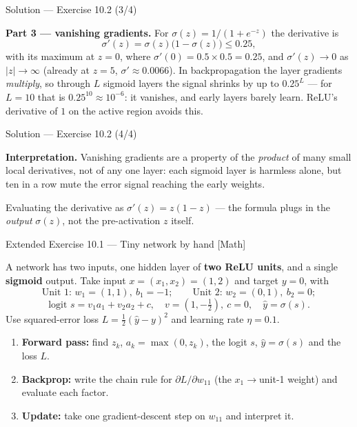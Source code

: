 \documentclass[aspectratio=169,11pt]{beamer}
\begin{document}
\begin{frame}{Solution --- Exercise 10.2 (3/4)}
\begin{solutionbox}
  \textbf{Part 3 --- vanishing gradients.} For
  $\sigma(z) = 1/(1 + e^{-z})$ the derivative is
  \[
    \sigma'(z) = \sigma(z)\big(1 - \sigma(z)\big) \le 0.25 ,
  \]
  with its maximum at $z = 0$, where $\sigma'(0) = 0.5 \times 0.5 = 0.25$,
  and $\sigma'(z) \to 0$ as $|z| \to \infty$ (already at $z = 5$,
  $\sigma' \approx 0.0066$). In backpropagation the
  layer gradients \emph{multiply}, so through $L$ sigmoid layers the
  signal shrinks by up to $0.25^{L}$ --- for $L = 10$ that is
  $0.25^{10} \approx 10^{-6}$: it vanishes, and early
  layers barely learn. ReLU's derivative of $1$ on the active region
  avoids this.
\end{solutionbox}
\end{frame}

\begin{frame}{Solution --- Exercise 10.2 (4/4)}
\begin{solutionbox}
  \medskip
  \textbf{Interpretation.} Vanishing gradients are a property of the
  \emph{product} of many small local derivatives, not of any one layer:
  each sigmoid layer is harmless alone, but ten in a row mute the error
  signal reaching the early weights.

\end{solutionbox}
\begin{mistake}
  Evaluating the derivative as $\sigma'(z) = z(1 - z)$ --- the formula plugs in
  the \emph{output} $\sigma(z)$, not the pre-activation $z$ itself.
\end{mistake}
\end{frame}

\begin{frame}{Extended Exercise 10.1 --- Tiny network by hand [Math]}
\begin{longexercise}
  A network has two inputs, one hidden layer of \textbf{two ReLU units}, and a single
  \textbf{sigmoid} output. Take input $x=(x_1,x_2)=(1,2)$ and target $y=0$, with
  \[
    \text{Unit 1: } w_1=(1,1),\ b_1=-1;\qquad
    \text{Unit 2: } w_2=(0,1),\ b_2=0;
  \]
  \[
    \text{logit } s=v_1a_1+v_2a_2+c,\quad v=(1,-\tfrac12),\ c=0,\quad
    \hat y=\sigma(s).
  \]
  Use squared-error loss $L=\tfrac12(\hat y-y)^2$ and learning rate $\eta=0.1$.
  \begin{enumerate}
    \item \textbf{Forward pass:} find $z_k$, $a_k=\max(0,z_k)$, the logit $s$,
          $\hat y=\sigma(s)$ and the loss $L$.
    \item \textbf{Backprop:} write the chain rule for $\partial L/\partial w_{11}$
          (the $x_1\!\to\!$unit-1 weight) and evaluate each factor.
    \item \textbf{Update:} take one gradient-descent step on $w_{11}$ and interpret it.
  \end{enumerate}
\end{longexercise}
\end{frame}
\end{document}

